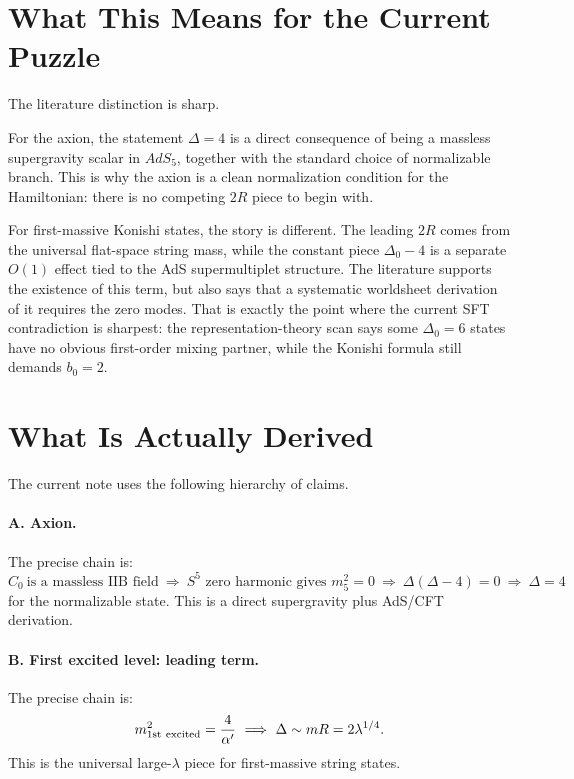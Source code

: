 \documentclass[12pt]{article}
\newcommand{\D}{\Delta}
\begin{document}
\section{What This Means for the Current Puzzle}

The literature distinction is sharp.

For the axion, the statement $\D=4$ is a direct consequence of being a massless supergravity scalar in
$AdS_5$, together with the standard choice of normalizable branch.  This is why the axion is a clean
normalization condition for the Hamiltonian: there is no competing $2R$ piece to begin with.

For first-massive Konishi states, the story is different.  The leading $2R$ comes from the universal
flat-space string mass, while the constant piece $\D_0-4$ is a separate $O(1)$ effect tied to the
AdS supermultiplet structure.  The literature supports the existence of this term, but also says that a
systematic worldsheet derivation of it requires the zero modes.  That is exactly the point where the
current SFT contradiction is sharpest: the representation-theory scan says some $\D_0=6$ states have no
obvious first-order mixing partner, while the Konishi formula still demands $b_0=2$.

\appendix

\section{What Is Actually Derived}

The current note uses the following hierarchy of claims.

\paragraph{A. Axion.}
The precise chain is:
\begin{equation}
C_0\ \text{is a massless IIB field}
\ \Longrightarrow \
\text{$S^5$ zero harmonic gives }m_5^2=0
\ \Longrightarrow \
\D(\D-4)=0
\ \Longrightarrow \
\D=4
\end{equation}
for the normalizable state.  This is a direct supergravity plus AdS/CFT derivation.

\paragraph{B. First excited level: leading term.}
The precise chain is:
\begin{equation}
m^2_{\rm 1st\ excited}=\frac{4}{\alpha'}
\ \Longrightarrow \
\D\sim mR=2\lambda^{1/4}.
\end{equation}
This is the universal large-$\lambda$ piece for first-massive string states.
\end{document}
